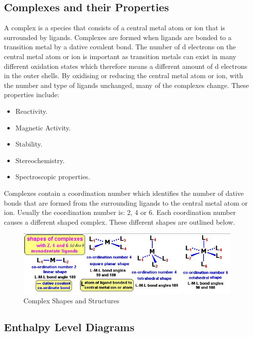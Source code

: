 	\subsection{Complexes and their Properties}

A complex is a species that consists of a central metal atom or ion that is surrounded by ligands. Complexes are formed when ligands are bonded to a transition metal by a dative covalent bond. The number of d electrons on the central metal atom or ion is important as transition metals can exist in many different oxidation states which therefore means a different amount of d electrons in the outer shells.  By oxidising or reducing the central metal atom or ion, with the number and type of ligands unchanged, many of the complexes change. These properties include:

\begin{itemize}
\item Reactivity.
\item Magnetic Activity.
\item Stability.
\item Stereochemistry.
\item Spectroscopic properties.
\end{itemize}

Complexes contain a coordination number which identifies the number of dative bonds that are formed from the surrounding ligands to the central metal atom or ion. Usually the coordination number is: 2, 4 or 6. Each coordination number causes a different shaped complex. These different shapes are outlined below.

\begin{figure}[H]
    \includegraphics[width=\textwidth]{./Planning/Images/ComplexShapes.jpg}
    \caption{Complex Shapes and Structures} \label{fig:Complex Shapes}
\end{figure}




	\subsection{Enthalpy Level Diagrams}	

